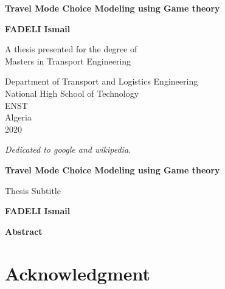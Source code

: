 \documentclass[12pt]{report}
\newenvironment{dedication}
  {\clearpage           %
   \thispagestyle{empty}%
   \vspace*{\stretch{1}}%
   \itshape             %
   \raggedleft          %
  }
  {\par %
   \vspace{\stretch{3}} %
   \clearpage           %
  }
\def\blankpage{%
      \clearpage%
      \thispagestyle{empty}%
      \addtocounter{page}{-1}%
      \null%
      \clearpage}
\begin{document}
\begin{titlepage}

   \begin{center}
   \thisfancypage{%
\setlength{\fboxsep}{10pt}\doublebox}{}
       \vspace*{1cm}
 	   \Huge
       \textbf{Travel Mode Choice Modeling using Game theory}
		\LARGE
		
       \vspace{0.5cm}
        
            
       \vspace{1.5cm}

       \textbf{FADELI Ismail}

       \vfill
            	\normalsize
       A thesis presented for the degree of\\
       Masters in Transport Engineering
            
       \vspace{0.8cm}
     
       
            \Large
       Department of Transport and Logistics Engineering\\
       National High School of Technology \\
       ENST\\
       Algeria\\
       2020
            
   \end{center}
   

\end{titlepage}
\blankpage
\begin{dedication}\thispagestyle{empty}
Dedicated to google and wikipedia.
\end{dedication}
\clearpage
\thispagestyle{empty}
\thispagestyle{plain}
\begin{center}
    \Large
    \textbf{Travel Mode Choice Modeling using Game theory}
        
    \vspace{0.4cm}
    \large
    Thesis Subtitle
        
    \vspace{0.4cm}
    \textbf{FADELI Ismail}
       
    \vspace{0.9cm}
    \textbf{Abstract}
\end{center}

\clearpage
\section*{Acknowledgment}\thispagestyle{empty}
\clearpage
\tableofcontents \thispagestyle{empty}
\listoffigures
{}
\clearpage
\end{document}
